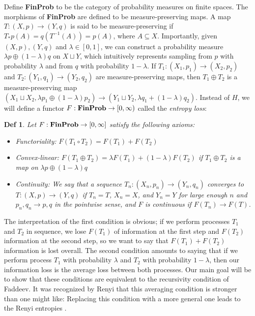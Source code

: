 \documentclass[11pt]{article}
\newtheorem{defn}{Def}
\theoremstyle{remark}
\newcommand{\catname}[1]{{\normalfont\textbf{#1}}}
\begin{document}
Define \catname{FinProb} to be the category of probability measures on finite
spaces. The morphisms of \catname{FinProb} are defined to be measure-preserving
maps. A map $T: (X, p) \to (Y, q)$ is said to be measure-preserving if $T_\ast
p(A) = q(T^{-1}(A)) = p(A)$, where $A \subseteq X$.
Importantly, given $(X, p), (Y,q)$ and $\lambda \in [0,1]$, we can construct a probability measure $\lambda p
\oplus (1-\lambda)q$ on $X \sqcup Y$, which intuitively represents sampling from
$p$ with probability $\lambda$ and from $q$ with probability $1-\lambda$. If $T_1 : (X_1, p_1) \to (X_2, p_2)$ and
$T_2:(Y_1, q_1) \to (Y_2, q_2)$ are measure-preserving maps, then $T_1 \oplus T_2$ is a measure-preserving map $(X_1\sqcup X_2, \lambda p_1
\oplus (1-\lambda)p_2) \to (Y_1 \sqcup Y_2, \lambda q_1 + (1-\lambda)q_2)$. 
Instead of $H$, we will define a functor $F:\catname{FinProb} \to \mathbb [0, \infty)$
called the \emph{entropy loss}:

\begin{defn}
  Let $F: \catname{FinProb} \to \mathbb [0, \infty]$ satisfy the following axioms:
  \begin{itemize}
  \item Functoriality: $F(T_1 \circ T_2) = F(T_1) + F(T_2)$
    \item Convex-linear: $F(T_1 \oplus T_2) = \lambda F(T_1) +
      (1-\lambda)F(T_2)$ if $T_1 \oplus T_2$ is a map on $\lambda p \oplus (1-\lambda)q$
     \item Continuity: We say that a sequence
     $T_n : (X_n, p_n) \to (Y_n, q_n)$ converges to $T: (X, p) \to (Y, q)$ if
     $T_n = T$, $X_n= X$, and $Y_n = Y$ for large enough $n$ and $p_n,q_n \to p,
     q$ in the pointwise sense, and $F$ is continuous if $F(T_n) \to F(T)$.

     \end{itemize}
     \end{defn}

The interpretation of the first condition is obvious; if we perform processes
$T_1$ and $T_2$ in sequence, we lose $F(T_1)$ of information at the first step
and $F(T_2)$ information at the second step, so we want to say that $F(T_1) +
F(T_2)$ information is lost overall. The second condition amounts to saying that
if we perform process $T_1$ with probability $\lambda$ and $T_2$ with probability
$1-\lambda$, then our information loss is the average loss between both
processes. Our main goal will be to show that these conditions are equivalent to
the recursivity condition of Faddeev. It was recognized by Renyi that this averaging
condition is stronger than one might like: Replacing this condition with a more
general one leads to the Renyi entropies \cite{renyi}.
\end{document}
